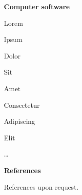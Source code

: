 \documentclass[a4paper,10pt,final]{memoir}
\newcommand{\Sep}{\vspace{1.5em}}
\newcommand{\SmallSep}{\vspace{0.5em}}
\newcommand{\CVSection}[1]
  {\Large\textbf{#1}\par
  \SmallSep\normalsize\normalfont}
\newcommand{\CVItem}[1]
  {\textbf{\color{RoyalBlue} #1}}
\begin{document}
\CVItem{Computer software}
\begin{multicols}{3}
\begin{compactitem}[\color{RoyalBlue}$\circ$]
  \item Lorem 
  \item Ipsum 
  \item Dolor 
  \item Sit 
  \item Amet
  \item Consectetur 
  \item Adipiscing 
  \item Elit
  \item \ldots
\end{compactitem}
\end{multicols}
\Sep 

\CVSection{References}
References upon request.

\end{document}
